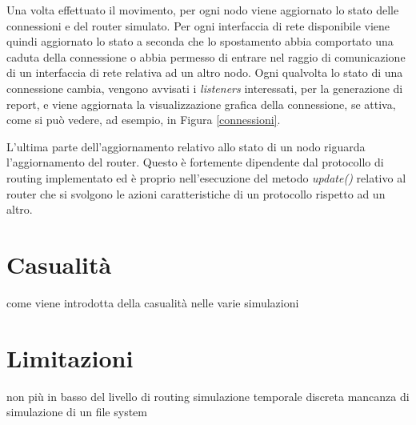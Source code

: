 Una volta effettuato il movimento, per ogni nodo viene aggiornato lo stato delle connessioni e del router simulato. Per ogni interfaccia di rete disponibile viene quindi aggiornato lo stato a seconda che lo spostamento abbia comportato una caduta della connessione o abbia permesso di entrare nel raggio di comunicazione di un interfaccia di rete relativa ad un altro nodo. Ogni qualvolta lo stato di una connessione cambia, vengono avvisati i \textit{listeners} interessati, per la generazione di report, e viene aggiornata la visualizzazione grafica della connessione, se attiva, come si può vedere, ad esempio, in Figura \ref{connessioni}.
\\

L'ultima parte dell'aggiornamento relativo allo stato di un nodo riguarda l'aggiornamento del router. Questo è fortemente dipendente dal protocollo di routing implementato ed è proprio nell'esecuzione del metodo \textit{update()} relativo al router che si svolgono le azioni caratteristiche di un protocollo rispetto ad un altro.

\section{Casualità}
come viene introdotta della casualità nelle varie simulazioni

\section{Limitazioni}
\label{limitazioniONE}
non più in basso del livello di routing
simulazione temporale discreta
mancanza di simulazione di un file system


